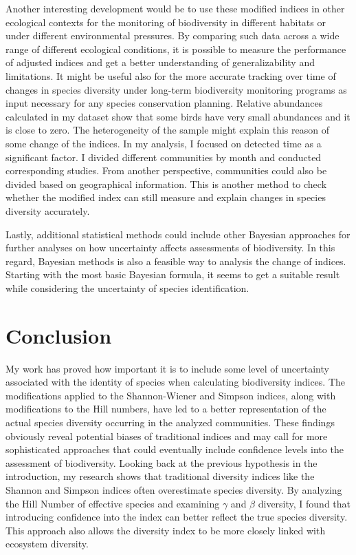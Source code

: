 \documentclass[a4paper,12pt]{article}
\begin{document}
Another interesting development would be to use these modified indices in other ecological contexts for the monitoring of biodiversity in different habitats or under different environmental pressures. By comparing such data across a wide range of different ecological conditions, it is possible to measure the performance of adjusted indices and get a better understanding of generalizability and limitations. It might be useful also for the more accurate tracking over time of changes in species diversity under long-term biodiversity monitoring programs as input necessary for any species conservation planning. Relative abundances calculated in my dataset show that some birds have very small abundances and it is close to zero. The heterogeneity of the sample might explain this reason of some change of the indices. In my analysis, I focused on detected time as a significant factor. I divided different communities by month and conducted corresponding studies. From another perspective, communities could also be divided based on geographical information. This is another method to check whether the modified index can still measure and explain changes in species diversity accurately.

Lastly, additional statistical methods could include other Bayesian approaches for further analyses on how uncertainty affects assessments of biodiversity. In this regard, Bayesian methods is also a feasible way to analysis the change of indices. Starting with the most basic Bayesian formula, it seems to get a suitable result while considering the uncertainty of species identification.


\section{Conclusion}
My work has proved how important it is to include some level of uncertainty associated with the identity of species when calculating biodiversity indices. The modifications applied to the Shannon-Wiener and Simpson indices, along with modifications to the Hill numbers, have led to a better representation of the actual species diversity occurring in the analyzed communities. These findings obviously reveal potential biases of traditional indices and may call for more sophisticated approaches that could eventually include confidence levels into the assessment of biodiversity. Looking back at the previous hypothesis in the introduction, my research shows that traditional diversity indices like the Shannon and Simpson indices often overestimate species diversity. By analyzing the Hill Number of effective species and examining $\gamma$ and $\beta$ diversity, I found that introducing confidence into the index can better reflect the true species diversity. This approach also allows the diversity index to be more closely linked with ecosystem diversity.
\end{document}
